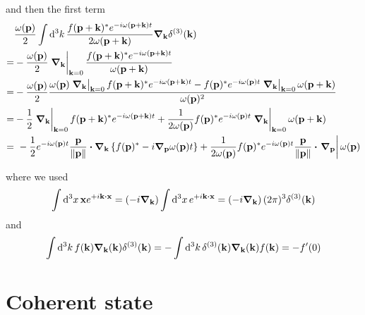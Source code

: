 and then the first term
\begin{equation}
	\begin{split}
		&
		\frac{\omega(\vb{p})}{2}
		\int\dd[3]{k}
		\frac{
			f(\vb{p}+\vb{k})^*
			e^{-i\omega(\vb{p}+\vb{k})t}
		}{2\omega(\vb{p}+\vb{k})}
		\grad_{\vb{k}}
		\delta^{(3)}(\vb{k})
		\\
		=&
		-
		\frac{\omega(\vb{p})}{2}
		\eval{\grad_{\vb{k}}}_{\vb{k}=0}
		\frac{
			f(\vb{p}+\vb{k})^*
			e^{-i\omega(\vb{p}+\vb{k})t}
		}{\omega(\vb{p}+\vb{k})}
		\\
		=&
		-
		\frac{\omega(\vb{p})}{2}
		\frac{
			\omega(\vb{p})
			\eval{\grad_{\vb{k}}}_{\vb{k}=0}
			f(\vb{p}+\vb{k})^*
			e^{-i\omega(\vb{p}+\vb{k})t}
			-
			f(\vb{p})^*
			e^{-i\omega(\vb{p})t}
			\eval{\grad_{\vb{k}}}_{\vb{k}=0}
			\omega(\vb{p}+\vb{k})
		}{\omega(\vb{p})^2}
		\\
		=&
		-
		\frac{1}{2}
		\eval{\grad_{\vb{k}}}_{\vb{k}=0}
		f(\vb{p}+\vb{k})^*
		e^{-i\omega(\vb{p}+\vb{k})t}
		+
		\frac{1}{2\omega(\vb{p})}
		f(\vb{p})^*
		e^{-i\omega(\vb{p})t}
		\eval{\grad_{\vb{k}}}_{\vb{k}=0}
		\omega(\vb{p}+\vb{k})
		\\
		=&\
		-
		\frac{1}{2}
		e^{-i\omega(\vb{p})t}
		\frac{\vb{p}}{\norm{\vb{p}}}
		\vdot\grad_{\vb{k}}
		\left\{
			f(\vb{p})^*
			-
			i\grad_{\vb{p}}\omega(\vb{p})t
		\right\}
		+
		\frac{1}{2\omega(\vb{p})}
		f(\vb{p})^*
		e^{-i\omega(\vb{p})t}
		\frac{\vb{p}}{\norm{\vb{p}}}\vdot
		\eval{\grad_{\vb{p}}}
		\omega(\vb{p})
	\end{split}
\end{equation}

where we used
\begin{equation}
	\int\dd[3]{x}
	\vb{x}
	e^{+i\vb{k}\vdot\vb{x}}
	=
	\left(-i\grad_{\vb{k}}\right)
	\int\dd[3]{x}
	e^{+i\vb{k}\vdot\vb{x}}
	=
	\left(-i\grad_{\vb{k}}\right)
	(2\pi)^3
	\delta^{(3)}(\vb{k})
\end{equation}
and
\begin{equation}
	\int\dd[3]{k}
	f(\vb{k})
	\grad_{\vb{k}}(\vb{k})
	\delta^{(3)}(\vb{k})
	=
	-
	\int\dd[3]{k}
	\delta^{(3)}(\vb{k})
	\grad_{\vb{k}}(\vb{k})
	f(\vb{k})
	=
	-
	f^\prime(0)
\end{equation}


\section{Coherent state}
